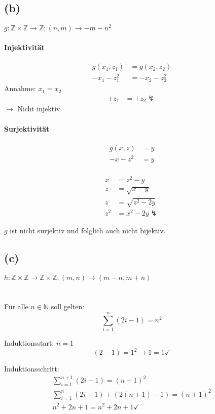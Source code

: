 \documentclass[11pt,a4paper]{article}
\begin{document}
\subsection{(b)}

$g: \mathbb{Z} \times \mathbb{Z} \rightarrow \mathbb{Z}; (n,m) \rightarrow -m-n^2$

\paragraph{Injektivität}
\begin{align*}
g(x_1, z_1) &= g(x_2, z_2)\\
-x_1-z_1^2 &= -x_2-z_2^2
\end{align*}
Annahme: $x_1 = x_2$
\begin{align*}
\pm z_1 &= \pm z_2 \lightning
\end{align*}
$\rightarrow$ Nicht injektiv.

\paragraph{Surjektivität}
\begin{align*}
g(x, z) &= y\\
-x-z^2 &= y\\
\end{align*}

\begin{align}
x &= z^2-y\\
z &= \sqrt{x-y}\\
z &= \sqrt{z^2-2y}\\
z^2 &= x^2-2y \lightning
\end{align}

$g$ ist nicht surjektiv und folglich auch nicht bijektiv.


\subsection{(c)}
$h: \mathbb{Z} \times \mathbb{Z} \rightarrow \mathbb{Z} \times \mathbb{Z}; (m,n) \rightarrow (m-n, m+n)$


\section{}
Für alle $n \in \mathbb{N}$ soll gelten:
\begin{equation*}
\sum_{i=1}^{n} (2i-1) = n^2
\end{equation*}

Induktionsstart: $n=1$
\begin{equation*}
(2-1) = 1^2 \rightarrow 1 = 1 \checkmark
\end{equation*}

Induktionsschritt:
\begin{align*}
\sum_{i=1}^{n+1} (2i-1) = (n+1)^2\\
\sum_{i=1}^{n} (2i-1) + (2(n+1)-1) = (n+1)^2\\
n^2 + 2n + 1 = n^2 + 2n + 1 \checkmark
\end{align*}
\end{document}
